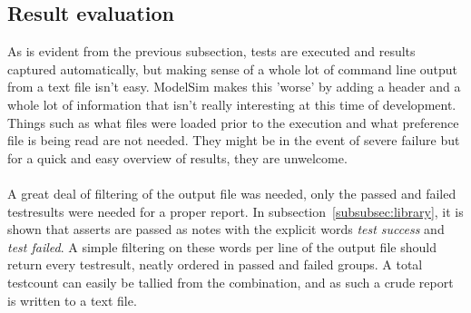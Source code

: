 \documentclass[11pt,british]{article}
\begin{document}
\subsection{Result evaluation}
As is evident from the previous subsection, tests are executed and results captured automatically, but making sense of a whole lot of command line output from a text file isn't easy. ModelSim makes this 'worse' by adding a header and a whole lot of information that isn't really interesting at this time of development. Things such as what files were loaded prior to the execution and what preference file is being read are not needed. They might be in the event of severe failure but for a quick and easy overview of results, they are unwelcome.\\
\\
A great deal of filtering of the output file was needed, only the passed and failed testresults were needed for a proper report. In subsection~\ref{subsubsec:library}, it is shown that asserts are passed as notes with the explicit words \emph{test success} and \emph{test failed}. A simple filtering on these words per line of the output file should return every testresult, neatly ordered in passed and failed groups. A total testcount can easily be tallied from the combination, and as such a crude report is written to a text file.
\end{document}
